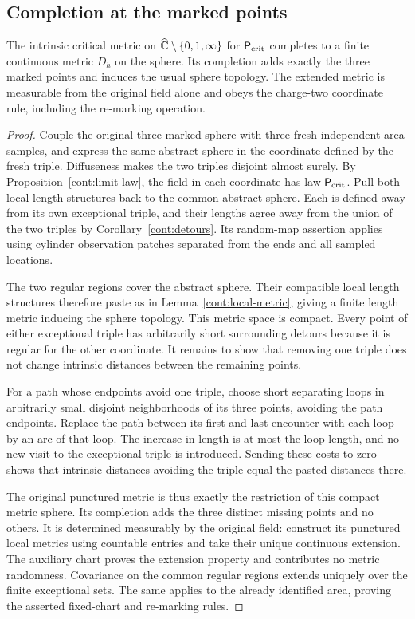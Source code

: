 \subsection{Completion at the marked points}\label{cont:completion-section}

\begin{proposition}\label{cont:sphere-completion}
The intrinsic critical metric on
$\widehat{\mathbb C}\setminus\{0,1,\infty\}$ for $\mathsf P_{\rm crit}$ completes to a finite
continuous metric $D_h$ on the sphere.  Its completion adds exactly the three
marked points and induces the usual sphere topology.  The extended metric
is measurable from the original field alone and obeys the charge-two
coordinate rule, including the re-marking operation.
\end{proposition}

\begin{proof}
Couple the original three-marked sphere with three fresh independent area
samples, and express the same abstract sphere in the coordinate defined by
the fresh triple.  Diffuseness makes the two triples disjoint almost surely.
By Proposition~\ref{cont:limit-law}, the field in each coordinate has law
$\mathsf P_{\rm crit}$.  Pull both local length structures back to the
common abstract sphere.  Each is defined away from its own exceptional
triple, and their lengths agree away from the union of the two triples by
Corollary~\ref{cont:detours}.  Its random-map assertion applies using cylinder
observation patches separated from the ends and all sampled locations.

The two regular regions cover the abstract sphere.  Their compatible
local length structures therefore paste as in
Lemma~\ref{cont:local-metric}, giving a finite length metric inducing the
sphere topology.  This metric space is compact.  Every point of either
exceptional triple has arbitrarily short surrounding detours because it
is regular for the other coordinate.  It remains to show that removing
one triple does not change intrinsic distances between the remaining
points.

For a path whose endpoints avoid one triple, choose short separating loops in
arbitrarily small disjoint neighborhoods of its three points, avoiding the
path endpoints.  Replace the path between its first and last encounter
with each loop by an arc of that loop.  The increase in length is at most
the loop length, and no new visit to the exceptional triple is introduced.
Sending these costs to zero shows that intrinsic distances avoiding the
triple equal the pasted distances there.

The original punctured metric is thus exactly the restriction of this
compact metric sphere.  Its completion adds the three distinct missing
points and no others.  It is determined measurably by the original field:
construct its punctured local metrics using countable entries and take
their unique continuous extension.  The auxiliary chart proves the
extension property and contributes no metric randomness.  Covariance on
the common regular regions extends uniquely over the finite exceptional
sets.  The same applies to the already identified area, proving the
asserted fixed-chart and re-marking rules.
\end{proof}

